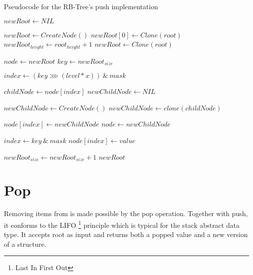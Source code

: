 \begin{listing}[ht!]        
    \caption{Pseudocode for the RB-Tree's push implementation}
    \label{lst:rb-tree-push}
    
    \begin{algorithmic}
            \State $newRoot \leftarrow NIL$

                \State $newRoot \leftarrow CreateNode()$
                \State $newRoot[0] \leftarrow Clone(root)$
                \State $newRoot_{height} \leftarrow root_{height} + 1$
            \Else 
                \State $newRoot \leftarrow Clone(root)$
            \EndIf
                        
            \State $node \leftarrow newRoot$
            \State $key \leftarrow newRoot_{size}$
    
                \State $index \leftarrow (key \ggg (level * x))\ \&\ mask$
                
                \State $childNode \leftarrow node[index]$
                \State $newChildNode \leftarrow NIL$

                    \State $newChildNode \leftarrow CreateNode()$
                \Else
                    \State $newChildNode \leftarrow clone(childNode)$
                \EndIf
                
                \State $node[index] \leftarrow newChildNode$
                \State $node \leftarrow newChildNode$
            \EndFor        
    
            \State $index \leftarrow key\ \&\ mask$
            \State $node[index] \leftarrow value$ 

            \State $newRoot_{size} \leftarrow newRoot_{size} + 1$
            \State \Return $newRoot$
        \EndFunction
    \end{algorithmic}
\end{listing}

\section{Pop}

Removing items from \rbtree is made possible by the pop operation. Together with push, it conforms to the LIFO \footnote{Last In First Out} principle which is typical for the stack abstract data type. It accepts root as input and returns both a popped value and a new version of a structure. 

